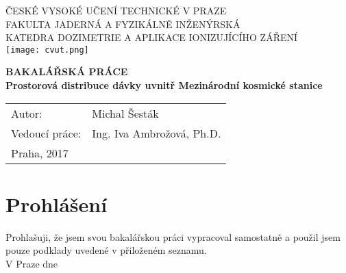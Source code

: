 \begin{center}
{\LARGE ČESKÉ VYSOKÉ UČENÍ TECHNICKÉ V PRAZE\\}
	\vspace{10pt}
{\large FAKULTA JADERNÁ A FYZIKÁLNĚ INŽENÝRSKÁ\\}
{\large KATEDRA DOZIMETRIE A APLIKACE IONIZUJÍCÍHO ZÁŘENÍ\\}
	\vspace{40pt}
	\texttt{[image: cvut.png]}

	\vspace{40pt}
{\Huge \textbf{BAKALÁŘSKÁ PRÁCE\\}}
	\vspace{10pt}
{\LARGE \textbf{Prostorová distribuce dávky uvnitř Mezinárodní kosmické stanice\\}}
	\vspace{150pt}

\end{center}
{\large
\begin{tabular}{p{4cm} p{8cm}}
Autor: & Michal Šesták\\
Vedoucí práce: & Ing. Iva Ambrožová, Ph.D.\\
Praha, 2017 & \\
\end{tabular}
}
\newpage
\vspace*{\fill}
\section*{Prohlášení}
Prohlašuji, že jsem svou bakalářskou práci vypracoval samostatně a použil jsem pouze podklady uvedené v přiloženém seznamu.\\[10pt]
V Praze dne \\[10pt]
\newpage
\vspace*{\fill}
